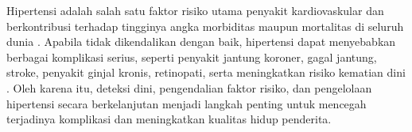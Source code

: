Hipertensi adalah salah satu faktor risiko utama penyakit kardiovaskular dan berkontribusi terhadap tingginya angka morbiditas maupun mortalitas di seluruh dunia \autocite{WHO2023}. Apabila tidak dikendalikan dengan baik, hipertensi dapat menyebabkan berbagai komplikasi serius, seperti penyakit jantung koroner, gagal jantung, stroke, penyakit ginjal kronis, retinopati, serta meningkatkan risiko kematian dini \autocite{WHO2023}. Oleh karena itu, deteksi dini, pengendalian faktor risiko, dan pengelolaan hipertensi secara berkelanjutan menjadi langkah penting untuk mencegah terjadinya komplikasi dan meningkatkan kualitas hidup penderita.


    
    
